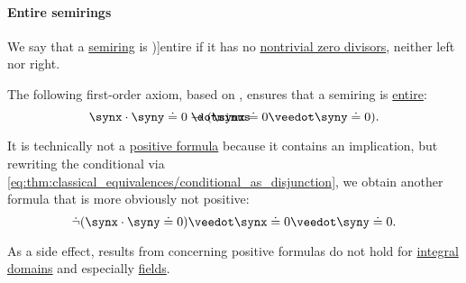 \paragraph{Entire semirings}

\begin{definition}\label{def:entire_semiring}
  We say that a \hyperref[def:semiring]{semiring} is \term[ru=целостное (\cite[def. 3.5.1]{Винберг2014КурсАлгебры})]{entire} if it has no \hyperref[def:divisibility]{nontrivial zero divisors}, neither left nor right.
\end{definition}

\begin{remark}\label{rem:entire_semiring_axiom}
  The following first-order axiom, based on \cite[def. III.1.10]{Aluffi2009Algebra}, ensures that a semiring is \hyperref[def:entire_semiring]{entire}:
  \begin{equation}\label{eq:rem:entire_semiring_axiom}
    \synx \cdot \syny \syneq 0 \synimplies (\synx \syneq 0 \synvee \syny \syneq 0).
  \end{equation}

  It is technically not a \hyperref[def:positive_formula]{positive formula} because it contains an implication, but rewriting the conditional via \eqref{eq:thm:classical_equivalences/conditional_as_disjunction}, we obtain another formula that is more obviously not positive:
  \begin{equation*}
    \synneg (\synx \cdot \syny \syneq 0) \synvee \synx \syneq 0 \synvee \syny \syneq 0.
  \end{equation*}

  As a side effect, results from  concerning positive formulas do not hold for \hyperref[def:integral_domain]{integral domains} and especially \hyperref[def:field]{fields}.
\end{remark}

